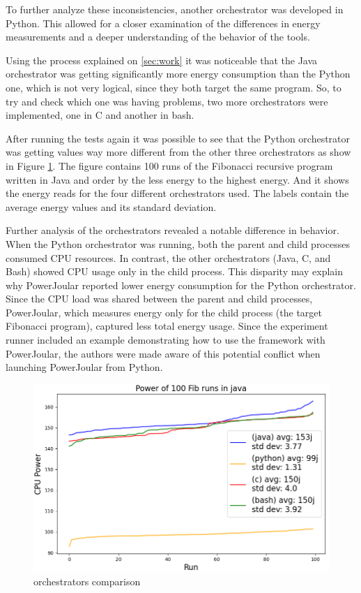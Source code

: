 \documentclass[sigplan]{acmart}
\begin{document}
To further analyze these inconsistencies, another orchestrator was developed in Python. This allowed for a closer examination of the differences in energy measurements and a deeper understanding of the behavior of the tools.

Using the process explained on \ref{sec:work} it was noticeable that the Java orchestrator was getting significantly more energy consumption than the Python one, which is not very logical, since they both target the same program. So, to try and check which one was having problems, two more orchestrators were implemented, one in C and another in bash.

After running the tests again it was possible to see that the Python orchestrator was getting values way more different from the other three orchestrators as show in Figure \ref{fig:4_orchs_comparison}.
The figure contains 100 runs of the Fibonacci recursive program written in Java and order by the less energy to the highest energy. And it shows the energy reads for the four different orchestrators used. The labels contain the average energy values and its standard deviation.

Further analysis of the orchestrators revealed a notable difference in behavior. When the Python orchestrator was running, both the parent and child processes consumed CPU resources. In contrast, the other orchestrators (Java, C, and Bash) showed CPU usage only in the child process. This disparity may explain why PowerJoular reported lower energy consumption for the Python orchestrator. Since the CPU load was shared between the parent and child processes, PowerJoular, which measures energy only for the child process (the target Fibonacci program), captured less total energy usage.
Since the experiment runner included an example demonstrating how to use the framework with PowerJoular, the authors were made aware of this potential conflict when launching PowerJoular from Python.

\begin{figure}%
  \centering
  \includegraphics[width = 0.5 \textwidth]{figures/4_orchestrators_comparison.png}
  \caption{orchestrators comparison}
  \label{fig:4_orchs_comparison}
\end{figure}
\end{document}
